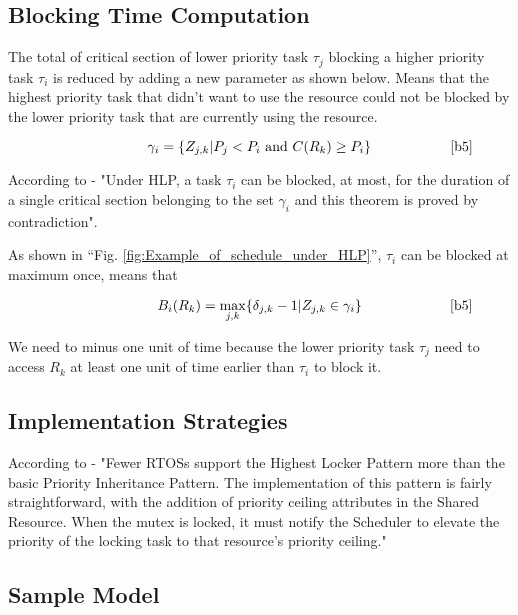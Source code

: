  
\subsection{Blocking Time Computation}

The total of critical section of lower priority task $\tau_{j}$ blocking a higher priority task $\tau_{i}$ is reduced by adding a new parameter as shown below. Means that the highest priority task that didn't want to use the resource could not be blocked by the lower priority task that are currently using the resource.

\begin{equation}
\citeequation{\gamma_{i}=\{Z_{j,k} | P_{j}<P_{i} \text{   and } C(R_{k})\geq P_{i} \}}{b5}\label{eq3}
\end{equation}

According to \cite{b5} - "Under HLP, a task $ \tau_{i} $ can be blocked, at most, for the duration of a single critical section belonging to the set $ \gamma_{i} $ and this theorem is proved by contradiction".  

As shown in ``Fig. \ref{fig:Example_of_schedule_under_HLP}'', $ \tau_{i} $ can be blocked at maximum once, means that

\begin{equation}
\citeequation{B_{i}(R_{k})=\underset{j,k}{\mathrm{max}} \{ \delta_{j,k}-1 | Z_{j,k} \in \gamma_{i}\}}{b5}\label{eq4}  
\end{equation}

We need to minus one unit of time because the lower priority task $ \tau_{j} $ need to access $ R_{k} $ at least one unit of time earlier than $ \tau_{i} $ to block it.

\subsection{Implementation Strategies} 

According to \cite{b6} - "Fewer RTOSs support the Highest Locker Pattern more than the basic Priority Inheritance Pattern. The implementation of this pattern  is fairly straightforward, with the addition of priority ceiling attributes in the Shared Resource. When the mutex is locked, it must notify the Scheduler to elevate the priority of the locking task to that resource's priority ceiling."

\subsection{Sample Model} 

